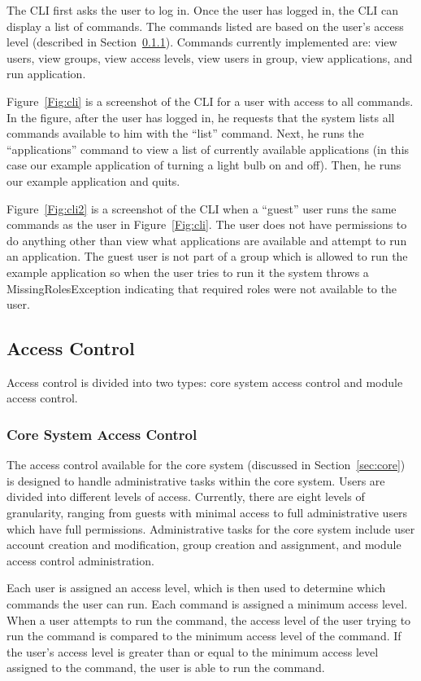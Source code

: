The CLI first asks the user to log in. Once the user has logged in, the CLI can
display a list of commands. The commands listed are based on the user's access
level (described in Section~\ref{sec:core_access}). Commands currently
implemented are: view users, view groups, view access levels, view users in
group, view applications, and run application.

Figure~\ref{Fig:cli} is a screenshot of the CLI for a user with access to all
commands. In the figure, after the user has logged in, he requests that the
system lists all commands available to him with the ``list'' command. Next, he
runs the ``applications'' command to view a list of currently available
applications (in this case our example application of turning a light bulb on
and off). Then, he runs our example application and quits.

Figure~\ref{Fig:cli2} is a screenshot of the CLI when a ``guest'' user runs the
same commands as the user in Figure~\ref{Fig:cli}. The user does not have
permissions to do anything other than view what applications are available and
attempt to run an application. The guest user is not part of a group which is
allowed to run the example application so when the user tries to run it the
system throws a MissingRolesException indicating that required roles were not
available to the user.
\subsection{Access Control}
\label{sec:access}
Access control is divided into two types: core system access control and module
access control.
\subsubsection{Core System Access Control}
\label{sec:core_access}
The access control available for the core system (discussed in
Section~\ref{sec:core}) is designed to handle administrative tasks within the
core system. Users are divided into different levels of access. Currently, there
are eight levels of granularity, ranging from guests with minimal access to
full administrative users which have full permissions. Administrative tasks for
the core system include user account creation and modification, group creation
and assignment, and module access control administration.

Each user is assigned an access level, which is then used to determine which
commands the user can run. Each command is assigned a minimum access level.
When a user attempts to run the command, the access level of the user trying to
run the command is compared to the minimum access level of the command. If the
user's access level is greater than or equal to the minimum access level
assigned to the command, the user is able to run the command.
